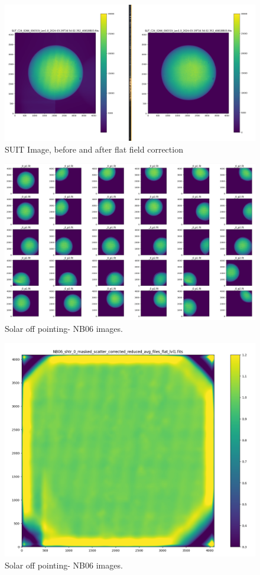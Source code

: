 \documentclass[11pt,a4paper]{article}
\begin{document}
	
	
	\begin{figure}
		\centering
		\includegraphics[width=0.7\linewidth]{pics/screenshot_2024-06-06_12-24-27}
		\caption{SUIT Image, before and after flat field correction}
		\label{fig:compare}
	\end{figure}
	
	\begin{figure}
		\centering
		\includegraphics[width=0.7\linewidth]{pics/screenshot_2024-06-06_11-35-10.png}
		\caption{Solar off pointing- NB06 images.}
		\label{fig:off pointing}
	\end{figure}
	
	\begin{figure}
		\centering
		\includegraphics[width=0.7\linewidth]{pics/screenshot_2024-06-06_11-40-31.png}
		\caption{Solar off pointing- NB06 images.}
		\label{fig:flat_field}
	\end{figure}
	
	
\end{document}
